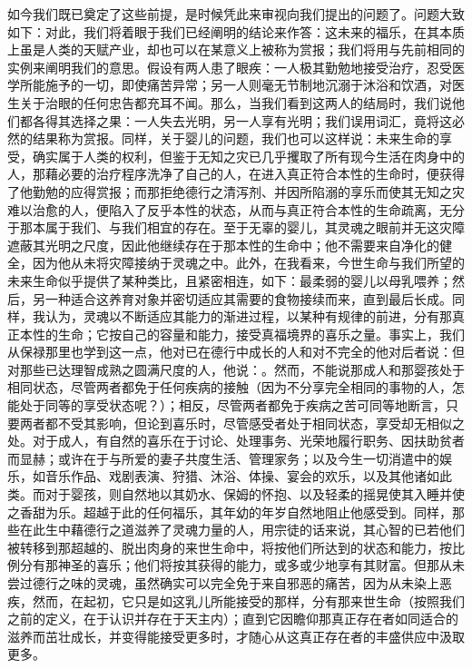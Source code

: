 如今我们既已奠定了这些前提，是时候凭此来审视向我们提出的问题了。问题大致如下：对此，我们将着眼于我们已经阐明的结论来作答：这未来的福乐，在其本质上虽是人类的天赋产业，却也可以在某意义上被称为赏报；我们将用与先前相同的实例来阐明我们的意思。假设有两人患了眼疾：一人极其勤勉地接受治疗，忍受医学所能施予的一切，即使痛苦异常；另一人则毫无节制地沉溺于沐浴和饮酒，对医生关于治眼的任何忠告都充耳不闻。那么，当我们看到这两人的结局时，我们说他们都各得其选择之果：一人失去光明，另一人享有光明；我们误用词汇，竟将这必然的结果称为赏报。同样，关于婴儿的问题，我们也可以这样说：未来生命的享受，确实属于人类的权利，但鉴于无知之灾已几乎攫取了所有现今生活在肉身中的人，那藉必要的治疗程序洗净了自己的人，在进入真正符合本性的生命时，便获得了他勤勉的应得赏报；而那拒绝德行之清泻剂、并因所陷溺的享乐而使其无知之灾难以治愈的人，便陷入了反乎本性的状态，从而与真正符合本性的生命疏离，无分于那本属于我们、与我们相宜的存在。至于无辜的婴儿，其灵魂之眼前并无这灾障遮蔽其光明之尺度，因此他继续存在于那本性的生命中；他不需要来自净化的健全，因为他从未将灾障接纳于灵魂之中。此外，在我看来，今世生命与我们所望的未来生命似乎提供了某种类比，且紧密相连，如下：最柔弱的婴儿以母乳喂养；然后，另一种适合这养育对象并密切适应其需要的食物接续而来，直到最后长成。同样，我认为，灵魂以不断适应其能力的渐进过程，以某种有规律的前进，分有那真正本性的生命；它按自己的容量和能力，接受真福境界的喜乐之量。事实上，我们从保禄那里也学到这一点，他对已在德行中成长的人和对不完全的他对后者说：但对那些已达理智成熟之圆满尺度的人，他说：。然而，不能说那成人和那婴孩处于相同状态，尽管两者都免于任何疾病的接触（因为不分享完全相同的事物的人，怎能处于同等的享受状态呢？）；相反，尽管两者都免于疾病之苦可同等地断言，只要两者都不受其影响，但论到喜乐时，尽管感受者处于相同状态，享受却无相似之处。对于成人，有自然的喜乐在于讨论、处理事务、光荣地履行职务、因扶助贫者而显赫；或许在于与所爱的妻子共度生活、管理家务；以及今生一切消遣中的娱乐，如音乐作品、戏剧表演、狩猎、沐浴、体操、宴会的欢乐，以及其他诸如此类。而对于婴孩，则自然地以其奶水、保姆的怀抱、以及轻柔的摇晃使其入睡并使之香甜为乐。超越于此的任何福乐，其年幼的年岁自然地阻止他感受到。同样，那些在此生中藉德行之道滋养了灵魂力量的人，用宗徒的话来说，其心智的已若他们被转移到那超越的、脱出肉身的来世生命中，将按他们所达到的状态和能力，按比例分有那神圣的喜乐；他们将按其获得的能力，或多或少地享有其财富。但那从未尝过德行之味的灵魂，虽然确实可以完全免于来自邪恶的痛苦，因为从未染上恶疾，然而，在起初，它只是如这乳儿所能接受的那样，分有那来世生命（按照我们之前的定义，在于认识并存在于天主内）；直到它因瞻仰那真正存在者如同适合的滋养而茁壮成长，并变得能接受更多时，才随心从这真正存在者的丰盛供应中汲取更多。\par

